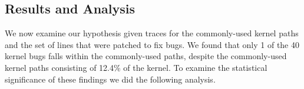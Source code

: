\subsection{Results and Analysis}
\label{Verification-of-Hypothesis}


%
%


%
%
We now examine our hypothesis given traces for the commonly-used kernel
paths and the set of lines that were patched to fix bugs.  We found that 
only 1 of the 40 kernel bugs falls within the commonly-used paths, despite 
the commonly-used kernel paths consisting of 12.4\% of the kernel.  
To examine the statistical significance of these findings we did the following 
analysis.

